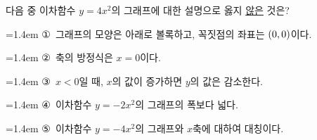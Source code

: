 다음 중 이차함수 $y=4x^2$의 그래프에 대한 설명으로 옳지 \underline{않은} 것은?
\par\medskip\par\noindent\hangindent=1.4em {\small ①}\ 그래프의 모양은 아래로 볼록하고, 꼭짓점의 좌표는 $(0{,}\mkern3mu 0)$이다.\par\noindent\hangindent=1.4em {\small ②}\ 축의 방정식은 $x=0$이다.\par\noindent\hangindent=1.4em {\small ③}\ $x<0$일 때, $x$의 값이 증가하면 $y$의 값은 감소한다.\par\noindent\hangindent=1.4em {\small ④}\ 이차함수 $y=-2x^2$의 그래프의 폭보다 넓다.\par\noindent\hangindent=1.4em {\small ⑤}\ 이차함수 $y=-4x^2$의 그래프와 $x$축에 대하여 대칭이다.\par\medskip
